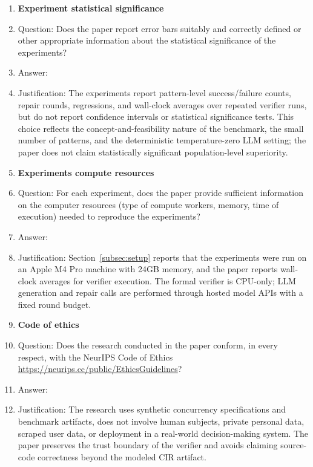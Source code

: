 \begin{enumerate}
\item {\bf Experiment statistical significance}
    \item[] Question: Does the paper report error bars suitably and correctly defined or other appropriate information about the statistical significance of the experiments?
    \item[] Answer: \answerNo{}
    \item[] Justification: The experiments report pattern-level success/failure counts, repair rounds, regressions, and wall-clock averages over repeated verifier runs, but do not report confidence intervals or statistical significance tests. This choice reflects the concept-and-feasibility nature of the benchmark, the small number of patterns, and the deterministic temperature-zero LLM setting; the paper does not claim statistically significant population-level superiority.

\item {\bf Experiments compute resources}
    \item[] Question: For each experiment, does the paper provide sufficient information on the computer resources (type of compute workers, memory, time of execution) needed to reproduce the experiments?
    \item[] Answer: \answerYes{}
    \item[] Justification: Section~\ref{subsec:setup} reports that the experiments were run on an Apple M4 Pro machine with 24GB memory, and the paper reports wall-clock averages for verifier execution. The formal verifier is CPU-only; LLM generation and repair calls are performed through hosted model APIs with a fixed round budget.

\item {\bf Code of ethics}
    \item[] Question: Does the research conducted in the paper conform, in every respect, with the NeurIPS Code of Ethics \url{https://neurips.cc/public/EthicsGuidelines}?
    \item[] Answer: \answerYes{}
    \item[] Justification: The research uses synthetic concurrency specifications and benchmark artifacts, does not involve human subjects, private personal data, scraped user data, or deployment in a real-world decision-making system. The paper preserves the trust boundary of the verifier and avoids claiming source-code correctness beyond the modeled CIR artifact.


\end{enumerate}
